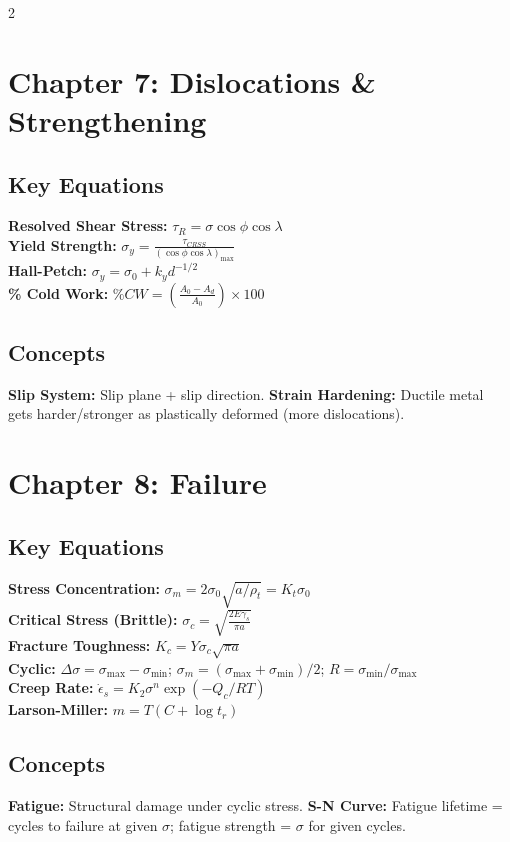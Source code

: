 \documentclass[7pt]{article}
\begin{document}
\begin{multicols*}{2}
\section*{Chapter 7: Dislocations \& Strengthening}
\subsection*{Key Equations}
\textbf{Resolved Shear Stress:} $\tau_R = \sigma\cos\phi\cos\lambda$ \\
\textbf{Yield Strength:} $\sigma_y = \frac{\tau_{CRSS}}{(\cos\phi\cos\lambda)_{\max}}$ \\
\textbf{Hall-Petch:} $\sigma_y = \sigma_0 + k_y d^{-1/2}$ \\
\textbf{\% Cold Work:} $\%CW = \left(\frac{A_0 - A_d}{A_0}\right)\times100$
\subsection*{Concepts}
\textbf{Slip System:} Slip plane + slip direction. \textbf{Strain Hardening:} Ductile metal gets harder/stronger as plastically deformed (more dislocations).

\section*{Chapter 8: Failure}
\subsection*{Key Equations}
\textbf{Stress Concentration:} $\sigma_m = 2\sigma_0\sqrt{a/\rho_t} = K_t\sigma_0$ \\
\textbf{Critical Stress (Brittle):} $\sigma_c = \sqrt{\frac{2E\gamma_s}{\pi a}}$ \\
\textbf{Fracture Toughness:} $K_c = Y\sigma_c\sqrt{\pi a}$ \\
\textbf{Cyclic:} $\Delta\sigma=\sigma_{\max}-\sigma_{\min}$; $\sigma_m=(\sigma_{\max}+\sigma_{\min})/2$; $R=\sigma_{\min}/\sigma_{\max}$ \\
\textbf{Creep Rate:} $\dot{\epsilon}_s = K_2\sigma^n\exp(-Q_c/RT)$ \\
\textbf{Larson-Miller:} $m=T(C+\log t_r)$
\subsection*{Concepts}
\textbf{Fatigue:} Structural damage under cyclic stress. \textbf{S-N Curve:} Fatigue lifetime = cycles to failure at given $\sigma$; fatigue strength = $\sigma$ for given cycles.


\end{multicols*}
\end{document}
